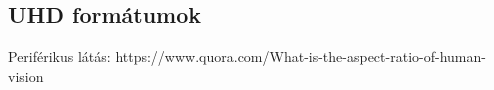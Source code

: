 \subsection{UHD formátumok}

Periférikus látás:
https://www.quora.com/What-is-the-aspect-ratio-of-human-vision

